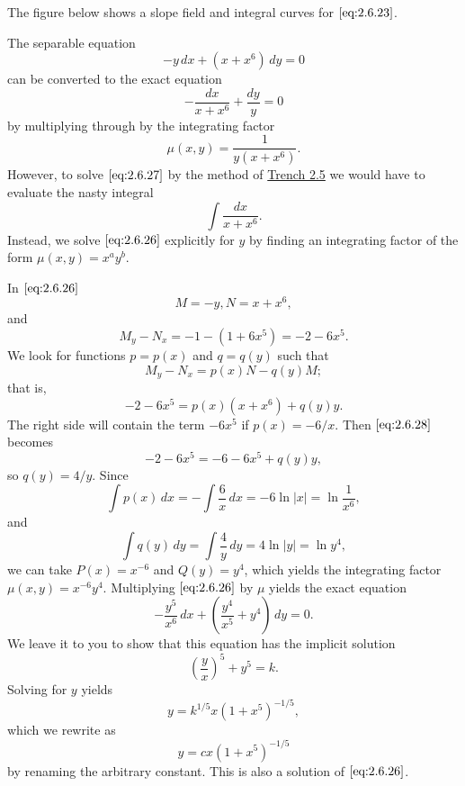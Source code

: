 \documentclass{ximera}
\begin{document}
\begin{example}
\begin{explanation}
The figure below shows a slope field and integral curves for
$\eqref{eq:2.6.23}$.


\begin{center}
\end{center}


\end{explanation}
\end{example}


\begin{example}\label{example:2.6.4}
The separable  equation
\begin{equation}\label{eq:2.6.26}
-y\,dx+(x+x^6)\,dy=0
\end{equation}
can be converted to the exact equation
\begin{equation} \label{eq:2.6.27}
-\frac{dx}{x+x^6}+\frac{dy}{y}=0
\end{equation}
by multiplying through
by the  integrating factor
$$
\mu(x,y)=\frac{1}{y(x+x^6)}.
$$
However, to solve $\eqref{eq:2.6.27}$ by the method of \href{https://ximera.osu.edu/ode/main/exactEquations/exactEquations}{Trench 2.5}
we would have to evaluate the nasty integral
$$
\int \frac{dx}{x+x^6}.
$$
Instead, we solve $\eqref{eq:2.6.26}$ explicitly for $y$ by finding  an
integrating factor of the form
$\mu(x,y)=x^ay^b$.

In $\eqref{eq:2.6.26}$
$$
M=-y, N=x+x^6,
$$
and
$$
M_y-N_x=-1-(1+6x^5)=-2-6x^5.
$$
We  look for functions
$p=p(x)$ and $q=q(y)$ such that
$$
M_y-N_x=p(x)N-q(y)M;
$$
that is,
\begin{equation}\label{eq:2.6.28}
-2-6x^5=p(x)(x+x^6)+q(y)y.
\end{equation}
The right side will contain the term $-6x^5$ if $p(x)=-6/x$.   Then
$\eqref{eq:2.6.28}$ becomes
$$
-2-6x^5=-6-6x^5+q(y)y,
$$
so  $q(y)=4/y$.  Since
$$
\int p(x)\,dx=-\int\frac{6}{x}\,dx=-6\ln|x|=\ln\frac{1}{x^6},
$$
 and
$$
\int q(y)\,dy=\int\frac{4}{y}\,dy=4\ln
|y|=\ln{y^4},
$$
we can take $P(x)=x^{-6}$ and $Q(y)=y^4$,
which yields the integrating factor $\mu(x,y)=x^{-6}y^4$.
Multiplying $\eqref{eq:2.6.26}$ by  $\mu$ yields the exact equation
$$
-\frac{y^5}{x^6}\,dx+\left(\frac{y^4}{x^5}+y^4\right)
\,dy=0.
$$
 We leave it to you to 
show that this equation has the implicit solution 
$$
\left(\frac{y}{x}\right)^5+y^5=k.
$$
 Solving for $y$ yields
$$
y=k^{1/5}x(1+x^5)^{-1/5},
$$
which we rewrite as
$$
y=cx(1+x^5)^{-1/5}
$$
by renaming the arbitrary constant.
This is also a solution of $\eqref{eq:2.6.26}$.


\end{example}
\end{document}
